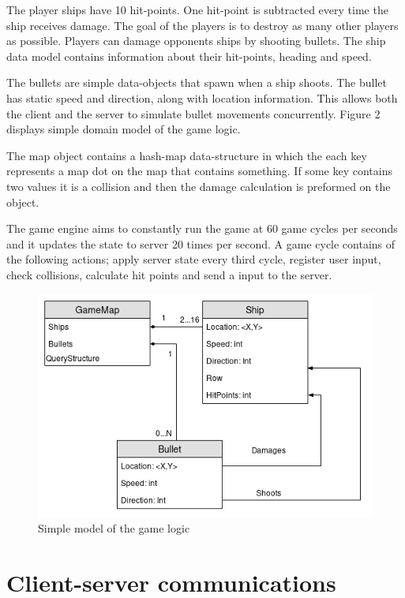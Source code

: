\documentclass[10pt,a4paper]{article}
\begin{document}
 The player ships have 10 hit-points. One hit-point is subtracted every time
 the ship receives damage. The goal of the players is to destroy as many other
 players as possible.  Players can damage opponents ships by shooting bullets.
 The ship data model contains information about their hit-points, heading and
 speed.

 The bullets are simple data-objects that spawn when a ship shoots. The bullet
 has static speed and direction, along with location information. This
 allows both the client and the server to simulate bullet movements concurrently.
 Figure 2 displays simple domain model of the game logic.
 
 The map object contains a hash-map data-structure in which the each key represents
 a map dot on the map that contains something. If some key contains two values
 it is a collision and then the damage calculation is preformed on the object.

 The game engine aims to constantly run the game at 60 game cycles per seconds
 and it updates the state to server 20 times per second. A game cycle contains
 of the following actions; apply server state every third cycle, register user input, check
 collisions, calculate hit points and send a input to the server.

 \begin{figure}
   \caption{Simple model of the game logic}
   \includegraphics[scale=0.6]{simpleModel.png}
 \end{figure}

 \section{Client-server communications}
\end{document}
